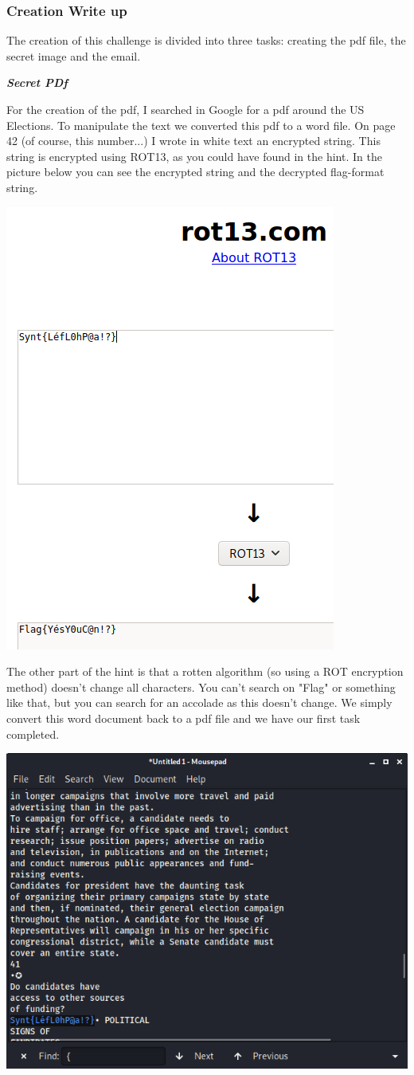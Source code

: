 \documentclass[../main.tex]{subfiles}
\begin{document}
\subsubsection{Creation Write up}
The creation of this challenge is divided into three tasks: creating the pdf file, the secret image and the email.

\textbf{\textit{Secret PDf}}

For the creation of the pdf, I searched in Google for a pdf around the US Elections. To manipulate the text we converted this pdf to a word file. On page 42 (of course, this number...) I wrote in white text an encrypted string. This string is encrypted using ROT13, as you could have found in the hint. In the picture below you can see the encrypted string and the decrypted flag-format string.

\begin{center}
    \includegraphics[width=0.5\linewidth ]{images/Robbe/sniffer_1.png}
\end{center}
\pagebreak
The other part of the hint is that a rotten algorithm (so using a ROT encryption method) doesn't change all characters. You can't search on "Flag" or something like that, but you can search for an accolade as this doesn't change. We simply convert this word document back to a pdf file and we have our first task completed.

\includegraphics[width=\linewidth]{images/Robbe/sniffer_2.png}
\end{document}
